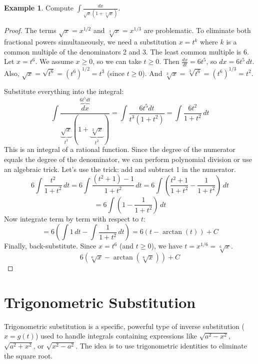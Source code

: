 \documentclass[11pt]{article}
\theoremstyle{definition}
\newtheorem{example}[theorem]{Example}
\theoremstyle{remark}
\begin{document}
\begin{example}
Compute $\int \frac{dx}{\sqrt{x}(1+\sqrt[3]{x})}$.
\begin{proof}
The terms $\sqrt{x} = x^{1/2}$ and $\sqrt[3]{x} = x^{1/3}$ are problematic. To eliminate both fractional powers simultaneously, we need a substitution $x = t^k$ where $k$ is a common multiple of the denominators 2 and 3. The least common multiple is 6.
Let $x = t^6$. We assume $x \ge 0$, so we can take $t \ge 0$.
Then $\frac{dx}{dt} = 6t^5$, so $dx = 6t^5 \, dt$.
Also, $\sqrt{x} = \sqrt{t^6} = (t^6)^{1/2} = t^3$ (since $t \ge 0$).
And $\sqrt[3]{x} = \sqrt[3]{t^6} = (t^6)^{1/3} = t^2$.

Substitute everything into the integral:
\[ \int \frac{\overbrace{dx}^{6t^5 dt}}{\underbrace{\sqrt{x}}_{t^3}(1+\underbrace{\sqrt[3]{x}}_{t^2})} = \int \frac{6t^5 dt}{t^3(1+t^2)} = \int \frac{6t^2}{1+t^2} \, dt \]
This is an integral of a rational function. Since the degree of the numerator equals the degree of the denominator, we can perform polynomial division or use an algebraic trick. Let's use the trick: add and subtract 1 in the numerator.
\[ 6 \int \frac{t^2}{1+t^2} \, dt = 6 \int \frac{(t^2+1) - 1}{1+t^2} \, dt = 6 \int \left( \frac{t^2+1}{1+t^2} - \frac{1}{1+t^2} \right) \, dt \]
\[ = 6 \int \left( 1 - \frac{1}{1+t^2} \right) \, dt \]
Now integrate term by term with respect to $t$:
\[ = 6 \left( \int 1 \, dt - \int \frac{1}{1+t^2} \, dt \right) = 6 (t - \arctan(t)) + C \]
Finally, back-substitute. Since $x = t^6$ (and $t \ge 0$), we have $t = x^{1/6} = \sqrt[6]{x}$.
\[ 6 (\sqrt[6]{x} - \arctan(\sqrt[6]{x})) + C \]
\end{proof}
\end{example}

\section{Trigonometric Substitution}

Trigonometric substitution is a specific, powerful type of inverse substitution ($x=g(t)$) used to handle integrals containing expressions like $\sqrt{a^2-x^2}$, $\sqrt{a^2+x^2}$, or $\sqrt{x^2-a^2}$. The idea is to use trigonometric identities to eliminate the square root.
\end{document}
